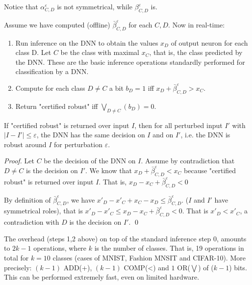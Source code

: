 Notice that  
$\alpha^{\varepsilon}_{C,D}$ is not symmetrical, while 
$\beta^{\varepsilon}_{C,D}$ is.


    
Assume we have computed (offline) $\bar{\beta}^{\varepsilon}_{C,D}$ for each $C,D$. Now in real-time:
\begin{enumerate}  
  \item[0] Run inference on the DNN to obtain the values $x_D$ of output neuron for each class D. Let $C$ be the class with maximal $x_{C}$, that is, the class predicted by the DNN. These are the basic inference operations standardly performed for classification by a DNN.
  \item[1] Compute for each class $D \neq C$
  a bit $b_D=1$ iff $x_D +\bar{\beta}^{\varepsilon}_{C,D} > x_C$.
  \item[2] Return "certified robust" iff $\bigvee_{D \neq C}(b_D)=0$.
\end{enumerate}

\begin{proposition}
  If "certified robust" is returned over input $I$, 
  then for all perturbed input $I'$ with  $|I - I'| \leq \varepsilon$,
  the DNN has the same decision on $I$ and on $I'$, i.e. the DNN is robust around $I$ for perturbation $\varepsilon$.
\end{proposition}

\begin{proof}
  Let $C$ be the decision of the DNN on $I$.
Assume by contradiction that $D \neq C$ is the decision on $I'$. 
  We know that 
  $x_D +\bar{\beta}^{\varepsilon}_{C,D} < x_C$
  because "certified robust" is returned over input $I$.
  That  is, $x_D - x_C +\bar{\beta}^{\varepsilon}_{C,D} < 0$

  By definition of $\bar{\beta}^{\varepsilon}_{C,D}$,
  we have $x'_D - x'_C + x_C - x_D \leq \bar{\beta}^{\varepsilon}_{C,D}$.
  ($I$ and $I'$ have symmetrical roles), 
  that is 
  $x'_D - x'_C \leq x_D - x_C + \bar{\beta}^{\varepsilon}_{C,D} < 0$.
  That is $x'_D < x'_C$, a contradiction with $D$ is the decision on $I'$.
  \qed
\end{proof}

The overhead (steps 1,2 above) on top of the standard inference step 0, 
amounts to $2k-1$ operations, where $k$ is the number of classes. 
That is, 19 operations in total for $k=10$ classes (cases of MNIST, Fashion MNSIT and CIFAR-10). More precisely: $(k-1)$ ADD(+), 
$(k-1)$ COMP(<) and $1$ OR($\bigvee$) of ($k-1$) bits.
This can be performed extremely fast, even on limited hardware.